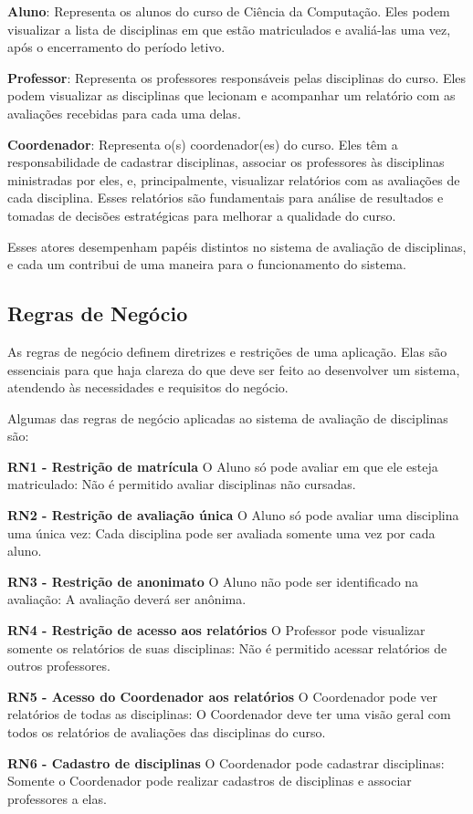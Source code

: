 \begin{alineas}
  \item \textbf{Aluno}: Representa os alunos do curso de Ciência da Computação. Eles podem visualizar a lista de disciplinas em que estão matriculados e avaliá-las uma vez, após o encerramento do período letivo.
  \item \textbf{Professor}: Representa os professores responsáveis pelas disciplinas do curso. Eles podem visualizar as disciplinas que lecionam e acompanhar um relatório com as avaliações recebidas para cada uma delas.
  \item \textbf{Coordenador}: Representa o(s) coordenador(es) do curso. Eles têm a responsabilidade de cadastrar disciplinas, associar os professores às disciplinas ministradas por eles, e, principalmente, visualizar relatórios com as avaliações de cada disciplina. Esses relatórios são fundamentais para análise de resultados e tomadas de decisões estratégicas para melhorar a qualidade do curso.
\end{alineas}

Esses atores desempenham papéis distintos no sistema de avaliação de disciplinas, e cada um contribui de uma maneira para o funcionamento do sistema.

\subsection{Regras de Negócio}
As regras de negócio definem diretrizes e restrições de uma aplicação. Elas são essenciais para que haja clareza do que deve ser feito ao desenvolver um sistema, atendendo às necessidades e requisitos do negócio.

Algumas das regras de negócio aplicadas ao sistema de avaliação de disciplinas são:

\begin{alineas}
  \item \textbf{RN1 - Restrição de matrícula} O Aluno só pode avaliar em que ele esteja matriculado: Não é permitido avaliar disciplinas não cursadas.
  \item \textbf{RN2 - Restrição de avaliação única} O Aluno só pode avaliar uma disciplina uma única vez: Cada disciplina pode ser avaliada somente uma vez por cada aluno.
  \item \textbf{RN3 - Restrição de anonimato} O Aluno não pode ser identificado na avaliação: A avaliação deverá ser anônima.
  \item \textbf{RN4 - Restrição de acesso aos relatórios} O Professor pode visualizar somente os relatórios de suas disciplinas: Não é permitido acessar relatórios de outros professores.
  \item \textbf{RN5 - Acesso do Coordenador aos relatórios} O Coordenador pode ver relatórios de todas as disciplinas: O Coordenador deve ter uma visão geral com todos os relatórios de avaliações das disciplinas do curso.
  \item \textbf{RN6 - Cadastro de disciplinas} O Coordenador pode cadastrar disciplinas: Somente o Coordenador pode realizar cadastros de disciplinas e associar professores a elas.
\end{alineas}

